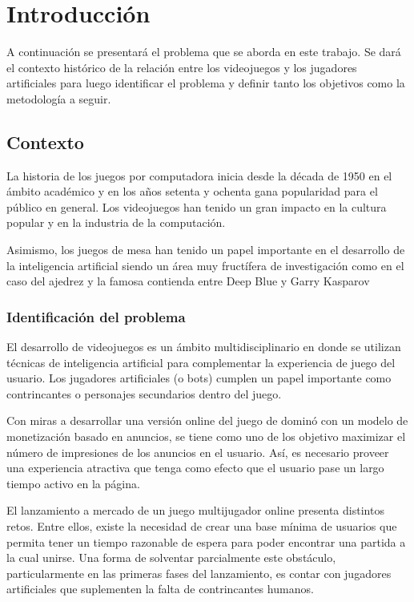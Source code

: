 \chapter*{Introducción}


\noindent

A continuación se presentará el problema que se aborda en este trabajo. Se dará
el contexto histórico de la relación entre los videojuegos y los jugadores
artificiales para luego identificar el problema y definir tanto los objetivos
como la metodología a seguir.

\section{Contexto}

La historia de los juegos por computadora inicia desde la década de 1950 en el
ámbito académico y en los años setenta y ochenta gana popularidad para el
público en general. Los videojuegos han tenido un gran impacto en la cultura
popular y en la industria de la computación.

Asimismo, los juegos de mesa han tenido un papel importante en el desarrollo de
la inteligencia artificial siendo un área muy fructífera de investigación como
en el caso del ajedrez y la famosa contienda entre Deep Blue y Garry Kasparov

\subsection{Identificación del problema}

El desarrollo de videojuegos es un ámbito multidisciplinario en donde se
utilizan técnicas de inteligencia artificial para complementar la experiencia de
juego del usuario. Los jugadores artificiales (o bots) cumplen un papel
importante como contrincantes o personajes secundarios dentro del juego.

Con miras a desarrollar una versión online del juego de dominó con un modelo de
monetización basado en anuncios, se tiene como uno de los objetivo maximizar el
número de impresiones de los anuncios en el usuario. Así, es necesario proveer
una experiencia atractiva que tenga como efecto que el usuario pase un largo
tiempo activo en la página.

El lanzamiento a mercado de un juego multijugador online presenta distintos
retos. Entre ellos, existe la necesidad de crear una base mínima de usuarios que
permita tener un tiempo razonable de espera para poder encontrar una partida a
la cual unirse. Una forma de solventar parcialmente este obstáculo,
particularmente en las primeras fases del lanzamiento, es contar con jugadores
artificiales que suplementen la falta de contrincantes humanos.

